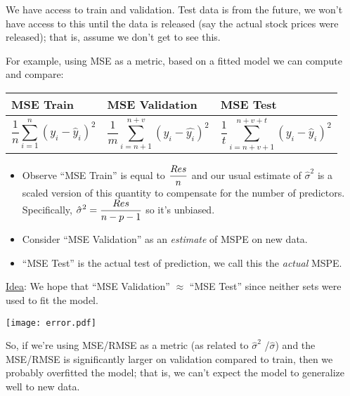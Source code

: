 We have access to train and validation. Test data is from the future,
we won't have access to this until the data is released (say
the actual stock prices were released); that is, assume we don't get
to see this.

For example, using MSE as a metric, based on a fitted model we can
compute and compare:
\begin{table}[ht]
    \centering
    \begin{tabularx}{\linewidth}{@{}YYY@{}}
        \toprule
        MSE Train & MSE Validation & MSE Test \\
        \midrule
        \[ \frac{1}{n} \sum_{i=1}^{n} (y_i-\hat{y}_i)^2 \]
                  &
        \[ \frac{1}{m} \sum_{i=n+1}^{n+v} (y_i-\hat{y_i})^2 \]
                  &
        \[ \frac{1}{t} \sum_{i=n+v+1}^{n+v+t}(y_i-\hat{y}_i)^2  \]
        \\
        \bottomrule
    \end{tabularx}
\end{table}

\begin{itemize}
    \item Observe ``MSE Train'' is equal to $ \displaystyle \frac{\relax{Res}}{n} $
          and our usual estimate of $ \hat{\sigma}^2 $
          is a scaled version of this quantity
          to compensate for the number of predictors. Specifically,
          $ \displaystyle  \hat{\sigma}^2=\frac{\relax{Res}}{n-p-1} $
          so it's unbiased.
    \item Consider ``MSE Validation'' as an \emph{estimate} of MSPE
          on new data.
    \item ``MSE Test'' is the actual test of prediction,
          we call this the \emph{actual} MSPE.\
\end{itemize}
\underline{Idea}: We hope that ``MSE Validation'' $ \approx $
``MSE Test'' since neither sets were used to fit the model.

\begin{minipage}{0.7\textwidth}
    \texttt{[image: error.pdf]}
\end{minipage}
\begin{minipage}{0.23\textwidth}
    \raggedright{}
    So, if we're using MSE/RMSE
    as a metric (as related to $ \hat{\sigma}^2 $ /$ \hat{\sigma} $)
    and the MSE/RMSE is significantly larger
    on validation compared to train,
    then we probably overfitted the model;
    that is, we can't expect the model
    to generalize well to new data.
\end{minipage}
